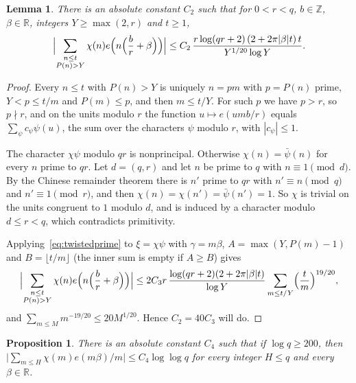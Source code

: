 \documentclass{aomart}
\numberwithin{equation}{section}
\newtheorem{lemma}[theorem]{Lemma}
\newtheorem{proposition}[theorem]{Proposition}
\theoremstyle{definition}
\newcommand{\R}{\mathbb{R}}
\newcommand{\Z}{\mathbb{Z}}
\begin{document}
\begin{lemma}\label{lem:major}
There is an absolute constant $C_2$ such that for $0<r<q$, $b\in\Z$, $\beta\in\R$, integers
$Y\ge\max(2,r)$ and $t\ge1$,
\[
  \Bigl|\sum_{\substack{n\le t\\P(n)>Y}}\chi(n)e\Bigl(n\Bigl(\frac br+\beta\Bigr)\Bigr)\Bigr|
  \le C_2\,\frac{r\log(qr+2)\,(2+2\pi|\beta|t)\,t}{Y^{1/20}\log Y}.
\]
\end{lemma}

\begin{proof}
Every $n\le t$ with $P(n)>Y$ is uniquely $n=pm$ with $p=P(n)$ prime, $Y<p\le t/m$ and
$P(m)\le p$, and then $m\le t/Y$. For such $p$ we have $p>r$, so $p\nmid r$, and on the units
modulo $r$ the function $u\mapsto e(umb/r)$ equals $\sum_\psi c_\psi\psi(u)$, the sum over the
characters $\psi$ modulo $r$, with $|c_\psi|\le1$.

The character $\chi\psi$ modulo $qr$ is nonprincipal. Otherwise $\chi(n)=\bar\psi(n)$ for every
$n$ prime to $qr$. Let $d=(q,r)$ and let $n$ be prime to $q$ with $n\equiv1\pmod d$. By the
Chinese remainder theorem there is $n'$ prime to $qr$ with $n'\equiv n\pmod q$ and
$n'\equiv1\pmod r$, and then $\chi(n)=\chi(n')=\bar\psi(n')=1$. So $\chi$ is trivial on the
units congruent to $1$ modulo $d$, and is induced by a character modulo $d\le r<q$, which
contradicts primitivity.

Applying~\eqref{eq:twistedprime} to $\xi=\chi\psi$ with $\gamma=m\beta$,
$A=\max(Y,P(m)-1)$ and $B=\lfloor t/m\rfloor$ (the inner sum is empty if $A\ge B$) gives
\[
  \Bigl|\sum_{\substack{n\le t\\P(n)>Y}}\chi(n)e\Bigl(n\Bigl(\frac br+\beta\Bigr)\Bigr)\Bigr|
  \le2C_3r\,\frac{\log(qr+2)(2+2\pi|\beta|t)}{\log Y}\sum_{m\le t/Y}\Bigl(\frac tm\Bigr)^{19/20},
\]
and $\sum_{m\le M}m^{-19/20}\le20M^{1/20}$. Hence $C_2=40C_3$ will do.
\end{proof}

\begin{proposition}\label{prop:hsum}
There is an absolute constant $C_4$ such that if $\log q\ge200$, then
$\bigl|\sum_{m\le H}\chi(m)e(m\beta)/m\bigr|\le C_4\log\log q$ for every integer $H\le q$ and
every $\beta\in\R$.
\end{proposition}
\end{document}

